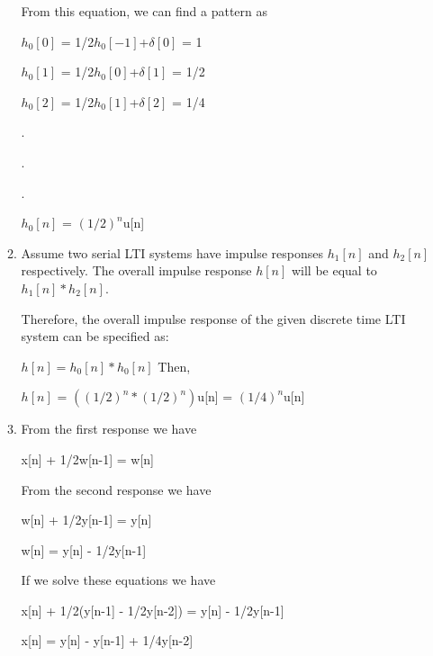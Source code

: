 \documentclass[10pt,a4paper, margin=1in]{article}
\begin{document}
\begin{enumerate}
\begin{enumerate}
    From this equation, we can find a pattern as
    \vspace{0.25cm}
    
    $h_0[0]$ = 1/2$h_0[-1]$+$\delta[0]$ = 1
    
    $h_0[1]$ = 1/2$h_0[0]$+$\delta[1]$ = 1/2
    
    $h_0[2]$ = 1/2$h_0[1]$+$\delta[2]$ = 1/4
    
        .
    
        .
    
        .
    
    $h_0[n]$ = $(1/2)^n$u[n]
    
    
    
    \item %
    Assume two serial LTI systems have impulse responses $h_1[n]$ and $h_2[n]$ respectively. The overall impulse response $h[n]$ will be equal to $h_1[n]*h_2[n]$.
    \vspace{0.25cm}
    
    Therefore, the overall impulse response of the given discrete time LTI system can be specified as:
    \vspace{0.25cm}
    
    $h[n]=h_0[n]*h_0[n]$ Then,
    
    $h[n]$ = $((1/2)^n*(1/2)^n)$u[n] = $(1/4)^n$u[n]
    
    \item %
    From the first response we have
    
    x[n] + 1/2w[n-1] = w[n]
    \vspace{0.25cm}
    
    From the second response we have
    
    w[n] + 1/2y[n-1] = y[n]
    
    w[n] = y[n] - 1/2y[n-1]
    \vspace{0.25cm}
    
    If we solve these equations we have
    
    x[n] + 1/2(y[n-1] - 1/2y[n-2]) = y[n] - 1/2y[n-1]
    
    x[n] = y[n] - y[n-1] + 1/4y[n-2]
    
    \end{enumerate}

\end{enumerate}
\end{document}
